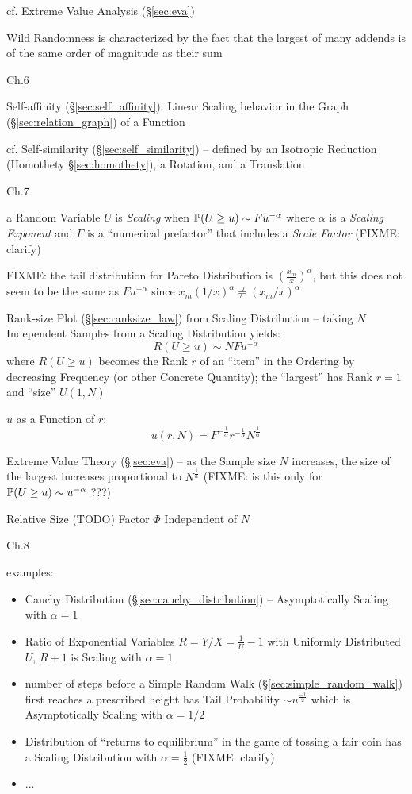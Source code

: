 cf. Extreme Value Analysis (\S\ref{sec:eva})

Wild Randomness is characterized by the fact that the largest of many addends is
of the same order of magnitude as their sum

Ch.6

Self-affinity (\S\ref{sec:self_affinity}): Linear Scaling behavior in the Graph
(\S\ref{sec:relation_graph}) of a Function

cf. Self-similarity (\S\ref{sec:self_similarity}) -- defined by an Isotropic
Reduction (Homothety \S\ref{sec:homothety}), a Rotation, and a Translation

Ch.7

a Random Variable $U$ is \emph{Scaling} when $\mathbb{P}(U \geq u) \sim Fu^{-\alpha}$
where $\alpha$ is a \emph{Scaling Exponent} and $F$ is a ``numerical prefactor''
that includes a \emph{Scale Factor} (FIXME: clarify)

FIXME: the tail distribution for Pareto Distribution is
$(\frac{x_m}{x})^\alpha$, but this does not seem to be the same as
$Fu^{-\alpha}$ since $x_m (1/x)^\alpha \neq (x_m/x)^\alpha$

Rank-size Plot (\S\ref{sec:ranksize_law}) from Scaling Distribution -- taking
$N$ Independent Samples from a Scaling Distribution yields:
\[
  R(U \geq u) \sim N F u^{-\alpha}
\]
where $R(U \geq u)$ becomes the Rank $r$ of an ``item'' in the Ordering by
decreasing Frequency (or other Concrete Quantity); the ``largest'' has Rank
$r=1$ and ``size'' $U(1, N)$

$u$ as a Function of $r$:
\[
  u(r, N) = F^{-\frac{1}{\alpha}} r^{-\frac{1}{\alpha}} N^\frac{1}{\alpha}
\]

Extreme Value Theory (\S\ref{sec:eva}) -- as the Sample size $N$ increases, the
size of the largest increases proportional to $N^{\frac{1}{\alpha}}$
(FIXME: is this only for $\mathbb{P}(U \geq u) \sim u^{-\alpha}$ ???)

Relative Size (TODO) Factor $\Phi$ Independent of $N$

Ch.8

examples:

\begin{itemize}
  \item Cauchy Distribution (\S\ref{sec:cauchy_distribution}) -- Asymptotically
    Scaling with $\alpha = 1$
  \item Ratio of Exponential Variables $R = Y/X = \frac{1}{U} - 1$ with
    Uniformly Distributed $U$, $R+1$ is Scaling with $\alpha = 1$
  \item number of steps before a Simple Random Walk
    (\S\ref{sec:simple_random_walk}) first reaches a prescribed height has Tail
    Probability $\sim u^\frac{-1}{2}$ which is Asymptotically Scaling with
    $\alpha = 1/2$
  \item Distribution of ``returns to equilibrium'' in the game of tossing a fair
    coin has a Scaling Distribution with $\alpha = \frac{1}{2}$ (FIXME: clarify)
  \item ...
\end{itemize}

